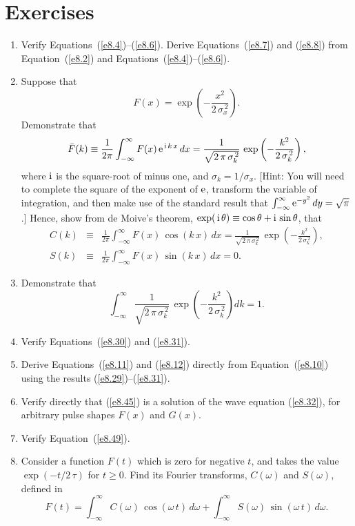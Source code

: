 \section{Exercises}
{\small
\begin{enumerate}
\item Verify Equations~(\ref{e8.4})--(\ref{e8.6}). Derive  Equations~(\ref{e8.7}) and (\ref{e8.8}) from Equation~(\ref{e8.2}) and
Equations~(\ref{e8.4})--(\ref{e8.6}).
\item Suppose that
$$
F(x) = \exp\left(-\frac{x^2}{2\,\sigma_x^{\,2}}\right).
$$
Demonstrate that
$$
\bar{F}(k) \equiv \frac{1}{2\pi}\int_{-\infty}^{\infty} F(x)\,{\rm e}^{\,{\rm i}\,k\,x}\,dx
= \frac{1}{\sqrt{2\,\pi\,\sigma_k^{\,2}}}\,\exp \left(-\frac{k^2}{2\,\sigma_k^{\,2}}\right),
$$
where ${\rm i}$ is the square-root of minus one, and $\sigma_k=1/\sigma_x$. [Hint: You
will need to complete the square of the exponent of ${\rm e}$, transform the variable of
integration, and then make use of the standard result that $\int_{-\infty}^\infty {\rm e}^{-y^2}\,dy = \sqrt{\pi}$.] Hence, show from de Moive's theorem, $\exp(\,{\rm i}\,\theta)\equiv\cos \theta + {\rm i}\,\sin \theta$,  that
\begin{eqnarray}
C(k)& \equiv& \frac{1}{2\pi}\int_{-\infty}^{\infty} F(x)\,\cos(k\,x)\,dx
= \frac{1}{\sqrt{2\,\pi\,\sigma_k^{\,2}}}\,\exp \left(-\frac{k^2}{2\,\sigma_k^{\,2}}\right),\nonumber\\[0.5ex]
S(k) &\equiv& \frac{1}{2\pi}\int_{-\infty}^{\infty} F(x)\,\sin(k\,x)\,dx=0.\nonumber
\end{eqnarray}
\item Demonstrate that
$$
\int_{-\infty}^{\infty} \frac{1}{\sqrt{2\,\pi\,\sigma_k^{\,2}}}\,\exp \left(-\frac{k^2}{2\,\sigma_k^{\,2}}\right)dk = 1.
$$
\item Verify Equations~(\ref{e8.30}) and (\ref{e8.31}). 
\item Derive Equations~(\ref{e8.11}) and (\ref{e8.12}) directly from Equation~(\ref{e8.10}) using the results (\ref{e8.29})--(\ref{e8.31}).
\item Verify directly that (\ref{e8.45}) is a solution of the wave equation (\ref{e8.32}),
for arbitrary pulse shapes $F(x)$ and $G(x)$.
\item Verify Equation~(\ref{e8.49}).

\item Consider a function $F(t)$ which is zero for negative $t$, and takes the
value $\exp(-t/2\,\tau)$ for $t\geq 0$. Find its Fourier transforms, $C(\omega)$
and $S(\omega)$, defined in
$$
F(t) = \int_{-\infty}^\infty C(\omega)\,\cos(\omega\,t)\,d\omega + \int_{-\infty}^\infty S(\omega)\,\sin(\omega\,t)\,d\omega.
$$


\end{enumerate}}
